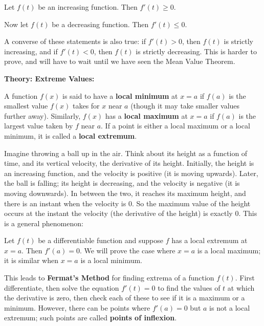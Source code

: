 \documentclass{article}
\begin{document}
Let $f(t)$ be an increasing function. Then $f'(t)\geq0$.



\vfill

Now let $f(t)$ be a decreasing function. Then $f'(t)\leq 0$.

\vfill


A converse of these statements is also true: if $f'(t)>0$, then $f(t)$ is strictly increasing, and if $f'(t)<0$, then $f(t)$ is strictly decreasing. This is harder to prove, and will have to wait until we have seen the Mean Value Theorem.



\clearpage





\textbf{Theory: Extreme Values:}

\vspace{5mm}



A function $f(x)$ is said to have a \textbf{local minimum} at $x=a$ if $f(a)$ is the smallest value $f(x)$ takes for $x$ near $a$ (though it may take smaller values further away). Similarly, $f(x)$ has a \textbf{local maximum} at $x=a$ if $f(a)$ is the largest value taken by $f$ near $a$. If a point is either a local maximum or a local minimum, it is called a \textbf{local extremum}.\bigskip


Imagine throwing a ball up in the air. Think about its height as a function of time, and its vertical velocity, the derivative of its height. Initially, the height is an increasing function, and the velocity is positive (it is moving upwards). Later, the ball is falling; its height is decreasing, and the velocity is negative (it is moving downwards). In between the two, it reaches its maximum height, and there is an instant when the velocity is 0. So the maximum value of the height occurs at the instant the velocity (the derivative of the height) is exactly 0. This is a general phenomenon:\bigskip

Let $f(t)$ be a differentiable function and suppose $f$ has a local extremum at $x=a$. Then $f'(a)=0$. We will prove the case where $x=a$ is a local maximum; it is similar when $x=a$ is a local minimum.

\vfill

This leads to \textbf{Fermat's Method} for finding extrema of a function $f(t)$. First differentiate, then solve the equation $f'(t)=0$ to find the values of $t$ at which the derivative is zero, then check each of these to see if it is a maximum or a minimum. However, there can be points where $f'(a)=0$ but $a$ is not a local extremum; such points are called \textbf{points of inflexion}.
\end{document}
